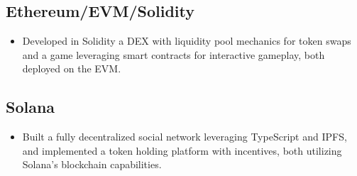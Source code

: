 \documentclass[a4paper, 12pt]{article}
\begin{document}
\subsection{Ethereum/EVM/Solidity}
\begin{itemize}
  \item Developed in Solidity a DEX with liquidity pool mechanics for token swaps and a game leveraging smart contracts for interactive gameplay, both deployed on the EVM. 
\end{itemize}


\subsection{Solana}
\begin{itemize}
  \item Built a fully decentralized social network leveraging TypeScript and IPFS, and implemented a token holding platform with incentives, both utilizing Solana's blockchain capabilities.
\end{itemize}
\end{document}
